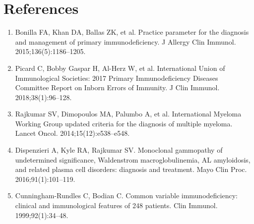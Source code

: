 \section*{References}
\begin{enumerate}
  \item Bonilla FA, Khan DA, Ballas ZK, et al. Practice parameter for the diagnosis and management of primary immunodeficiency. J Allergy Clin Immunol. 2015;136(5):1186--1205.
  \item Picard C, Bobby Gaspar H, Al-Herz W, et al. International Union of Immunological Societies: 2017 Primary Immunodeficiency Diseases Committee Report on Inborn Errors of Immunity. J Clin Immunol. 2018;38(1):96--128.
  \item Rajkumar SV, Dimopoulos MA, Palumbo A, et al. International Myeloma Working Group updated criteria for the diagnosis of multiple myeloma. Lancet Oncol. 2014;15(12):e538--e548.
  \item Dispenzieri A, Kyle RA, Rajkumar SV. Monoclonal gammopathy of undetermined significance, Waldenstrom macroglobulinemia, AL amyloidosis, and related plasma cell disorders: diagnosis and treatment. Mayo Clin Proc. 2016;91(1):101--119.
  \item Cunningham-Rundles C, Bodian C. Common variable immunodeficiency: clinical and immunological features of 248 patients. Clin Immunol. 1999;92(1):34--48.
\end{enumerate}

\clearpage
